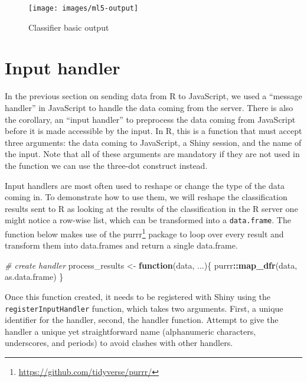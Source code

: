 \documentclass[10pt,]{krantz}
\makeatletter
\newenvironment{Shaded}{\begin{snugshade}}{\end{snugshade}}
\newcommand{\CommentTok}[1]{\textcolor[rgb]{0.37,0.37,0.37}{\textit{#1}}}
\newcommand{\ControlFlowTok}[1]{\textcolor[rgb]{0.27,0.27,0.27}{\textbf{#1}}}
\newcommand{\KeywordTok}[1]{\textcolor[rgb]{0.27,0.27,0.27}{\textbf{#1}}}
\newcommand{\NormalTok}[1]{#1}
\newcommand{\OperatorTok}[1]{\textcolor[rgb]{0.43,0.43,0.43}{\textbf{#1}}}
\newcommand{\StringTok}[1]{\textcolor[rgb]{0.5,0.5,0.5}{#1}}
\renewcommand{\href}[2]{#2\footnote{\url{#1}}}
\newenvironment{kframe}{%
\medskip{}
\setlength{\fboxsep}{.8em}
 \def\at@end@of@kframe{}%
 \ifinner\ifhmode%
  \def\at@end@of@kframe{\end{minipage}}%
  \begin{minipage}{\columnwidth}%
 \fi\fi%
 \def\FrameCommand##1{\hskip\@totalleftmargin \hskip-\fboxsep
 \colorbox{shadecolor}{##1}\hskip-\fboxsep
     \hskip-\linewidth \hskip-\@totalleftmargin \hskip\columnwidth}%
 \MakeFramed {\advance\hsize-\width
   \@totalleftmargin\z@ \linewidth\hsize
   \@setminipage}}%
 {\par\unskip\endMakeFramed%
 \at@end@of@kframe}
\renewenvironment{Shaded}{\begin{kframe}}{\end{kframe}}
\makeatother
\begin{document}
\begin{figure}[H]

{\centering \texttt{[image: images/ml5-output]} 

}

\caption{Classifier basic output}\label{fig:shiny-complete-ml5-output}
\end{figure}

\hypertarget{shiny-complete-input-handler}{%
\section{Input handler}\label{shiny-complete-input-handler}}

In the previous section on sending data from R to JavaScript, we used a ``message handler'' in JavaScript to handle the data coming from the server. There is also the corollary, an ``input handler'' to preprocess the data coming from JavaScript before it is made accessible by the input. In R, this is a function that must accept three arguments: the data coming to JavaScript, a Shiny session, and the name of the input. Note that all of these arguments are mandatory if they are not used in the function we can use the three-dot construct instead.

Input handlers are most often used to reshape or change the type of the data coming in. To demonstrate how to use them, we will reshape the classification results sent to R as looking at the results of the classification in the R server one might notice a row-wise list, which can be transformed into a \texttt{data.frame}. The function below makes use of the \href{https://github.com/tidyverse/purrr/}{purrr} \citep{R-purrr} package to loop over every result and transform them into data.frames and return a single data.frame.

\begin{Shaded}
\begin{Highlighting}[]
\CommentTok{# create handler}
\NormalTok{process_results <-}\StringTok{ }\ControlFlowTok{function}\NormalTok{(data, ...)\{}
\NormalTok{  purrr}\OperatorTok{::}\KeywordTok{map_dfr}\NormalTok{(data, as.data.frame)}
\NormalTok{\}}
\end{Highlighting}
\end{Shaded}

Once this function created, it needs to be registered with Shiny using the \texttt{registerInputHandler} function, which takes two arguments. First, a unique identifier for the handler, second, the handler function. Attempt to give the handler a unique yet straightforward name (alphanumeric characters, underscores, and periods) to avoid clashes with other handlers.
\end{document}
